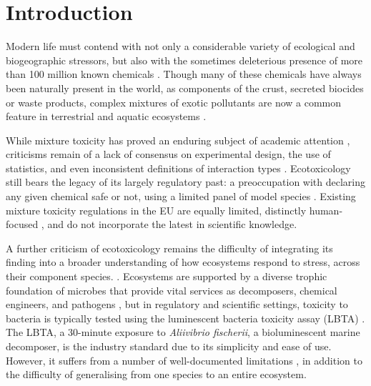 \documentclass[10pt]{article}
\begin{document}
\section{Introduction}
\label{S:1}

Modern life must contend with not only a considerable variety of ecological and biogeographic stressors, but also with the sometimes deleterious presence of more than 100 million known chemicals \cite{CAS2015}. Though many of these chemicals have always been naturally present in the world, as components of the crust, secreted biocides or waste products, complex mixtures of exotic pollutants are now a common feature in terrestrial and aquatic ecosystems \cite{EuropeanCommission2012a}. 

While mixture toxicity has proved an enduring subject of academic attention \cite{Bliss1939}, criticisms remain of a lack of consensus on experimental design, the use of statistics, and even inconsistent definitions of interaction types \cite{Jackson2016,Piggott2015,Schafer2018}. Ecotoxicology still bears the legacy of its largely regulatory past: a preoccupation with declaring any given chemical safe or not, using a limited panel of model species \cite{OECD2014SectionSystems}. Existing mixture toxicity regulations in the EU are equally limited, distinctly human-focused \cite{EuropeanCommission2012a}, and do not incorporate the latest in scientific knowledge.

A further criticism of ecotoxicology remains the difficulty of integrating its finding into a broader understanding of how ecosystems respond to stress, across their component species. \cite{Chapman2002a,Gessner2016}. Ecosystems are supported by a diverse trophic foundation of microbes that provide vital services as decomposers, chemical engineers, and pathogens \cite{Nannipieri2003a,VanderHeijden2008a}, but in regulatory and scientific settings, toxicity to bacteria is typically tested using the luminescent bacteria toxicity assay (LBTA) \cite{OECD2014SectionSystems}. The LBTA, a 30-minute exposure to \textit{Aliivibrio fischerii}, a bioluminescent marine decomposer, is the industry standard due to its simplicity and ease of use. However, it suffers from a number of well-documented limitations \cite{Ma2014}, in addition to the difficulty of generalising from one species to an entire ecosystem.
\end{document}
